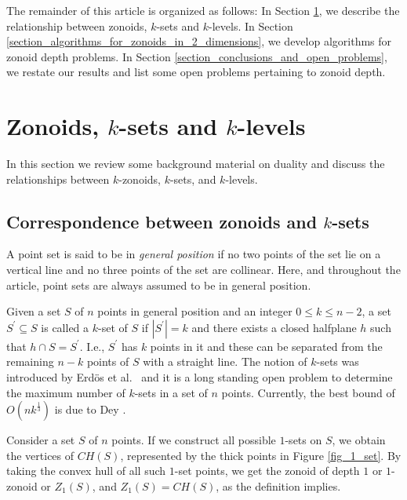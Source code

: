 \documentclass{elsart}
\begin{document}
The remainder of this article is organized as follows: In Section
\ref{section_zonoids_ksets_and_klevels}, we describe the relationship
between zonoids, $k$-sets and $k$-levels.  In Section
\ref{section_algorithms_for_zonoids_in_2_dimensions}, we develop
algorithms for zonoid depth problems.  In Section
\ref{section_conclusions_and_open_problems}, we restate our results
and list some open problems pertaining to zonoid depth.


\section{Zonoids, $k$-sets and $k$-levels}
\label{section_zonoids_ksets_and_klevels}

In this section we review some background material on duality and
discuss the relationships between $k$-zonoids, $k$-sets, and
$k$-levels.

\subsection{Correspondence between zonoids and $k$-sets}\label{subsection_correspondence_between_zonoids_and_ksets}

A point set is said to be in \emph{general position} if no two points
of the set lie on a vertical line and no three points of the set are
collinear. Here, and throughout the article, point sets are always
assumed to be in general position.

Given a set $S$ of $n$ points in general position and an integer $0
\le k \le n-2$, a set $S^{\prime} \subseteq S$ is called a $k$-set of
$S$ if $|S^{\prime}|=k$ and there exists a closed halfplane
$h$ such that $h\cap S=S^{\prime}$. I.e., $S^{\prime}$ has $k$ points
in it and these can be separated from the remaining $n-k$ points of
$S$ with a straight line. The notion of $k$-sets was introduced by
Erd\"{o}s et al.\ \cite{dissection_graphs_of_planar_point_sets} and it
is a long standing open problem to determine the maximum number of
$k$-sets in a set of $n$ points. Currently, the best bound of
$O(nk^{\frac{1}{3}})$ is due to Dey
\cite{improved_bounds_on_planar_ksets_and_klevels}.

Consider a set $S$ of $n$ points. If we construct all possible
$1$-sets on $S$, we obtain the vertices of $CH(S)$, represented by the
thick points in Figure \ref{fig_1_set}. By taking the convex hull of
all such $1$-set points, we get the zonoid of depth $1$ or $1$-zonoid
or $Z_1(S)$, and $Z_1(S) = CH(S)$, as the definition implies.
\end{document}
